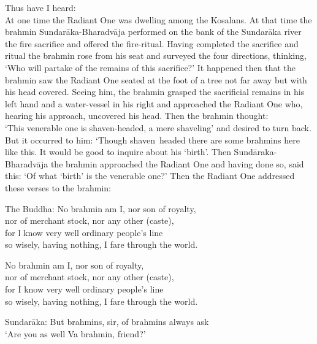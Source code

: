 Thus have I heard:\\

At one time the Radiant One was dwelling among the Kosalans. At that time the brahmin Sundar\=aka-Bharadv\=aja performed on the bank of the Sundar\=aka river the fire sacrifice and offered the fire-ritual. Having completed the sacrifice and ritual the brahmin rose from his seat and surveyed the four directions, thinking, `Who will partake of the remains of this sacrifice?' It happened then that the brahmin saw the Radiant One seated at the foot of a tree not far away but with his head covered. Seeing him, the brahmin grasped the sacrificial remains in his left hand and a water-vessel in his right and approached the Radiant One who, hearing his approach, uncovered his head. Then the brahmin thought:\\
`This venerable one is shaven-headed, a mere shaveling' and desired to turn back. But it occurred to him: `Though shaven~headed there are some brahmins here like this. It would be good to inquire about his `birth'. Then Sund\=araka-Bharadv\=aja the brahmin approached the Radiant One and having done so, said this: `Of what `birth' is the venerable one?' Then the Radiant One addressed these verses to the brahmin: 

\begin{MyDescription}{The Buddha:}
No brahmin am I, nor son of royalty,\\
nor of merchant stock, nor any other (caste),\\
for l know very well ordinary people's line\\
so wisely, having nothing, I fare through the world.
\end{MyDescription}

\begin{MyDescription}{}
No brahmin am I, nor son of royalty,\\
nor of merchant stock, nor any other (caste),\\
for I know very well ordinary people's line\\
so wisely, having nothing, I fare through the world.
\end{MyDescription}


\begin{MyDescription}[]{Sundar\=aka:}
But brahmins, sir, of brahmins always ask\\
`Are you as well Va brahmin, friend?'
\end{MyDescription}

